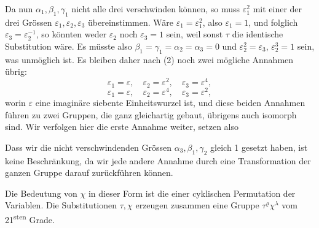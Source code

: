 Da nun $\alpha_1, \beta_1, \gamma_1$ nicht alle drei verschwinden können, so
muss $\varepsilon_1^2$ mit einer der drei Grössen $\varepsilon_1, \varepsilon_2, \varepsilon_3$ übereinstimmen.
Wäre $\varepsilon_1 = \varepsilon_1^2$, also $\varepsilon_1 = 1$, und folglich $\varepsilon_3 = \varepsilon_2^{-1}$, so könnten
weder $\varepsilon_2$ noch $\varepsilon_3 = 1$ sein, weil sonst $\tau$ die identische Substitution
wäre. Es müsste also $\beta_1 = \gamma_1 = \alpha_2 = \alpha_3 = 0$ und $\varepsilon_2^2 = \varepsilon_3$,
$\varepsilon_2^3 = 1$ sein, was unmöglich ist. Es bleiben daher nach (2) noch
zwei mögliche Annahmen übrig:
\[
\varepsilon_1 = \varepsilon, \quad \varepsilon_2 = \varepsilon^2, \quad \varepsilon_3 = \varepsilon^4,
\]
\[
\varepsilon_1 = \varepsilon, \quad \varepsilon_2 = \varepsilon^4, \quad \varepsilon_3 = \varepsilon^2,
\]
worin $\varepsilon$ eine imaginäre siebente Einheitswurzel ist, und diese
beiden Annahmen führen zu zwei  Gruppen, die
ganz gleichartig gebaut, übrigens auch isomorph sind. Wir verfolgen hier die erste Annahme weiter, setzen also

Dass wir die nicht verschwindenden Grössen $\alpha_3, \beta_1, \gamma_2$ gleich 1
gesetzt haben, ist keine Beschränkung, da wir jede andere Annahme durch eine Transformation der ganzen Gruppe darauf
zurückführen können.

Die Bedeutung von $\chi$ in dieser Form ist die einer cyklischen
Permutation der Variablen. Die Substitutionen $\tau, \chi$ erzeugen
zusammen eine Gruppe $\tau^\varrho \chi^\lambda$ vom 21\textsuperscript{sten} Grade.
